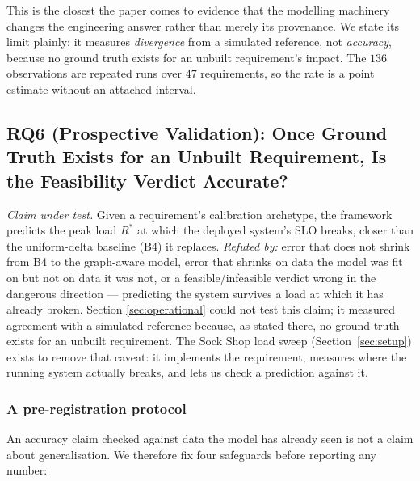 \documentclass[journal, 10pt]{IEEEtran}
\begin{document}
This is the closest the paper comes to evidence that the modelling machinery
changes the engineering answer rather than merely its provenance. We state its
limit plainly: it measures \emph{divergence} from a simulated reference, not
\emph{accuracy}, because no ground truth exists for an unbuilt requirement's
impact. The $136$ observations are repeated runs over $47$ requirements, so the
rate is a point estimate without an attached interval.


\subsection{RQ6 (Prospective Validation): Once Ground Truth Exists for an Unbuilt Requirement, Is the Feasibility Verdict Accurate?}
\label{sec:rq6}

\emph{Claim under test.} Given a requirement's calibration archetype, the
framework predicts the peak load $R^{*}$ at which the deployed system's SLO
breaks, closer than the uniform-delta baseline (B4) it replaces.
\emph{Refuted by:} error that does not shrink from B4 to the graph-aware
model, error that shrinks on data the model was fit on but not on data it was
not, or a feasible/infeasible verdict wrong in the dangerous direction ---
predicting the system survives a load at which it has already broken. Section
\ref{sec:operational} could not test this claim; it measured agreement with a
simulated reference because, as stated there, no ground truth exists for an
unbuilt requirement. The Sock Shop load sweep (Section~\ref{sec:setup}) exists
to remove that caveat: it implements the requirement, measures where the
running system actually breaks, and lets us check a prediction against it.

\subsubsection{A pre-registration protocol}
\label{sec:rq6-protocol}
An accuracy claim checked against data the model has already seen is not a
claim about generalisation. We therefore fix four safeguards before reporting
any number:
\end{document}
